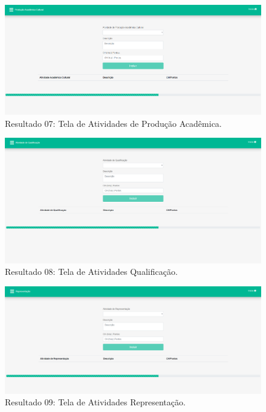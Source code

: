 \begin{figure}[htb]
    \centering
    \includegraphics[width=.8\textwidth]{img/pagina_producao.PNG}
    \caption[Resultado 07: Tela de Atividades de Produção Acadêmica]{Resultado 07: Tela de Atividades de Produção Acadêmica.}
    \label{fig:result07}
\end{figure}

\begin{figure}[htb]
    \centering
    \includegraphics[width=.8\textwidth]{img/pagina_at_qualificacao.PNG}
    \caption[Resultado 08: Tela de Atividades Qualificação]{Resultado 08: Tela de Atividades Qualificação.}
    \label{fig:result08}
\end{figure}

\begin{figure}[htb]
    \centering
    \includegraphics[width=.8\textwidth]{img/pagina_representacao.PNG}
    \caption[Resultado 09: Tela de Atividades Representação]{Resultado 09: Tela de Atividades Representação.}
    \label{fig:result09}
\end{figure}

